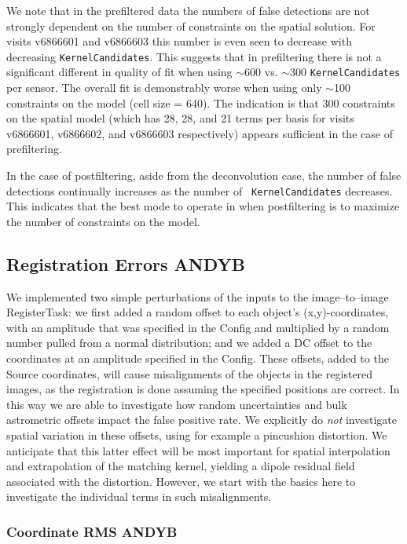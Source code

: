 \documentclass[prd, nofootinbib, floatfix, 11pt,tightenlines,times]{article}
\begin{document}
We note that in the prefiltered data the numbers of false detections
are not strongly dependent on the number of constraints on the spatial
solution.  For visits v6866601 and v6866603 this number is even seen
to decrease with decreasing {\tt KernelCandidates}.  This suggests
that in prefiltering there is not a significant different in quality
of fit when using $\sim$600 vs. $\sim$300 {\tt KernelCandidates} per
sensor.  The overall fit is demonstrably worse when using only
$\sim$100 constraints on the model (cell size = 640).  The indication
is that 300 constraints on the spatial model (which has 28, 28, and 21
terms per basis for visits v6866601, v6866602, and v6866603
respectively) appears sufficient in the case of prefiltering.

In the case of postfiltering, aside from the deconvolution case, the
number of false detections continually increases as the number of {\tt
  KernelCandidates} decreases.  This indicates that the best mode to
operate in when postfiltering is to maximize the number of constraints
on the model.

\subsection{Registration Errors {\bf ANDYB}}

We implemented two simple perturbations of the inputs to the
image--to--image RegisterTask: we first added a random offset to each
object's (x,y)-coordinates, with an amplitude that was specified in
the Config and multiplied by a random number pulled from a normal
distribution; and we added a DC offset to the coordinates at an
amplitude specified in the Config.  These offsets, added to the Source
coordinates, will cause misalignments of the objects in the registered
images, as the registration is done assuming the specified positions
are correct.  In this way we are able to investigate how random
uncertainties and bulk astrometric offsets impact the false positive
rate.  We explicitly do {\it not} investigate spatial variation in
these offsets, using for example a pincushion distortion.  We
anticipate that this latter effect will be most important for spatial
interpolation and extrapolation of the matching kernel, yielding a
dipole residual field associated with the distortion.  However, we
start with the basics here to investigate the individual terms in such
misalignments.

\subsubsection{Coordinate RMS {\bf ANDYB}}
\end{document}
